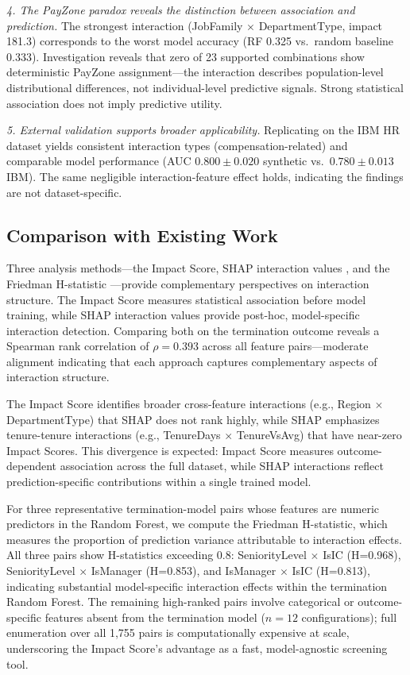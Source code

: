 \documentclass[conference]{IEEEtran}
\begin{document}
\textit{4. The PayZone paradox reveals the distinction between association and prediction.} The strongest interaction (JobFamily $\times$ DepartmentType, impact 181.3) corresponds to the worst model accuracy (RF 0.325 vs.\ random baseline 0.333). Investigation reveals that zero of 23 supported combinations show deterministic PayZone assignment---the interaction describes population-level distributional differences, not individual-level predictive signals. Strong statistical association does not imply predictive utility.

\textit{5. External validation supports broader applicability.} Replicating on the IBM HR dataset yields consistent interaction types (compensation-related) and comparable model performance (AUC $0.800\pm0.020$ synthetic vs.\ $0.780\pm0.013$ IBM). The same negligible interaction-feature effect holds, indicating the findings are not dataset-specific.

\subsection{Comparison with Existing Work}

Three analysis methods---the Impact Score, SHAP interaction values \cite{lundberg2020shap}, and the Friedman H-statistic \cite{friedman2008predictive}---provide complementary perspectives on interaction structure. The Impact Score measures statistical association before model training, while SHAP interaction values provide post-hoc, model-specific interaction detection. Comparing both on the termination outcome reveals a Spearman rank correlation of $\rho = 0.393$ across all feature pairs---moderate alignment indicating that each approach captures complementary aspects of interaction structure.

The Impact Score identifies broader cross-feature interactions (e.g., Region $\times$ DepartmentType) that SHAP does not rank highly, while SHAP emphasizes tenure-tenure interactions (e.g., TenureDays $\times$ TenureVsAvg) that have near-zero Impact Scores. This divergence is expected: Impact Score measures outcome-dependent association across the full dataset, while SHAP interactions reflect prediction-specific contributions within a single trained model.

For three representative termination-model pairs whose features are numeric predictors in the Random Forest, we compute the Friedman H-statistic, which measures the proportion of prediction variance attributable to interaction effects. All three pairs show H-statistics exceeding 0.8: SeniorityLevel $\times$ IsIC (H=0.968), SeniorityLevel $\times$ IsManager (H=0.853), and IsManager $\times$ IsIC (H=0.813), indicating substantial model-specific interaction effects within the termination Random Forest. The remaining high-ranked pairs involve categorical or outcome-specific features absent from the termination model ($n = 12$ configurations); full enumeration over all 1,755 pairs is computationally expensive at scale, underscoring the Impact Score's advantage as a fast, model-agnostic screening tool.
\end{document}
